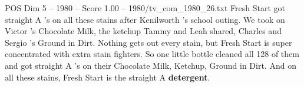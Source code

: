 \begin{textsample}{POS Dim 5 – 1980 – Score 1.00 – 1980/tv\_com\_1980\_26.txt}  \label{ex:f5_pos_009}
Fresh Start got straight A 's on all these stains after Kenilworth 's school outing.
We took on Victor 's Chocolate Milk, the ketchup Tammy and Leah shared, Charles and Sergio 's Ground in Dirt.
Nothing gets out every stain, but Fresh Start is super concentrated with extra stain fighters.
So one little bottle cleaned all 128 of them and got straight A 's on their Chocolate Milk, Ketchup, Ground in Dirt.
And on all these stains, Fresh Start is the straight A \textbf{detergent}.

\end{textsample}
